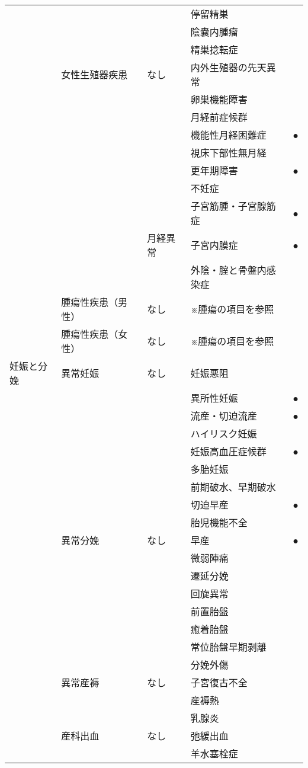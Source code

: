 \begin{xltabular}{\linewidth}{XXXXX}
 &  &  & 停留精巣 &  \\
 &  &  & 陰嚢内腫瘤 &  \\
 &  &  & 精巣捻転症 &  \\
 & 女性生殖器疾患 & なし & 内外生殖器の先天異常 &  \\
 &  &  & 卵巣機能障害 &  \\
 &  &  & 月経前症候群 &  \\
 &  &  & 機能性月経困難症 & ● \\
 &  &  & 視床下部性無月経 &  \\
 &  &  & 更年期障害 & ● \\
 &  &  & 不妊症 &  \\
 &  &  & 子宮筋腫・子宮腺筋症 & ● \\
 &  & 月経異常 & 子宮内膜症 & ● \\
 &  &  & 外陰・腟と骨盤内感染症 &  \\
 & 腫瘍性疾患（男性） & なし & ※腫瘍の項目を参照 &  \\
 & 腫瘍性疾患（女性） & なし & ※腫瘍の項目を参照 &  \\
妊娠と分娩 & 異常妊娠 & なし & 妊娠悪阻 &  \\
 &  &  & 異所性妊娠 & ● \\
 &  &  & 流産・切迫流産 & ● \\
 &  &  & ハイリスク妊娠 &  \\
 &  &  & 妊娠高血圧症候群 & ● \\
 &  &  & 多胎妊娠 &  \\
 &  &  & 前期破水、早期破水 &  \\
 &  &  & 切迫早産 & ● \\
 &  &  & 胎児機能不全 &  \\
 & 異常分娩 & なし & 早産 & ● \\
 &  &  & 微弱陣痛 &  \\
 &  &  & 遷延分娩 &  \\
 &  &  & 回旋異常 &  \\
 &  &  & 前置胎盤 &  \\
 &  &  & 癒着胎盤 &  \\
 &  &  & 常位胎盤早期剥離 &  \\
 &  &  & 分娩外傷 &  \\
 & 異常産褥 & なし & 子宮復古不全 &  \\
 &  &  & 産褥熱 &  \\
 &  &  & 乳腺炎 &  \\
 & 産科出血 & なし & 弛緩出血 &  \\
 &  &  & 羊水塞栓症 &  \\

\end{xltabular}

